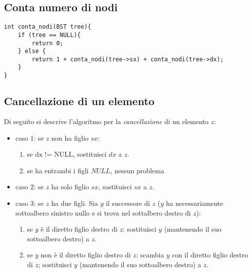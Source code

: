 \subsection{Conta numero di nodi}
\begin{lstlisting}[title={Conta numero di nodi di un ABR}]
int conta_nodi(BST tree){
    if (tree == NULL){
        return 0;
    } else {
        return 1 + conta_nodi(tree->sx) + conta_nodi(tree->dx);
    }
}
\end{lstlisting}

\subsection{Cancellazione di un elemento}
Di seguito si descrive l'algoritmo per la \textit{cancellazione} di un elemento $z$:
\begin{itemize}
	\item caso 1: se $z$ non ha figlio $\textit{sx}$:
	\begin{enumerate}
		\item se $\text{dx != NULL}$, sostituisci $\textit{dx}$ a $z$.
		\item se ha entrambi i figli $\textit{NULL}$, nessun problema
	\end{enumerate}
	\item caso 2: se $z$ ha solo figlio $\textit{sx}$, sostituisci $\textit{sx}$ a $z$.
	\item caso 3: se $z$ ha due figli. Sia $y$ il successore di $z$ ($y$ ha necessariamente sottoalbero sinistro nullo e si trova nel sottalbero destro di $z$):
	\begin{enumerate}
		\item se $y$ è il diretto figlio destro di $z$: sostituisci $y$ (mantenendo il suo sottoalbero destro) a $z$.
		\item se $y$ non è il diretto figlio destro di $z$: scambia $y$ con il diretto figlio destro di $z$; sostituisci $y$ (mantenendo il suo sottoalbero destro) a $z$.
	\end{enumerate}	
\end{itemize}


